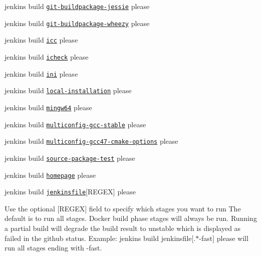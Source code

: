\begin{DoxyItemize}
\item jenkins build \href{https://build.libelektra.org/job/elektra-git-buildpackage-jessie/}{\tt git-\/buildpackage-\/jessie} please
\item jenkins build \href{https://build.libelektra.org/job/elektra-git-buildpackage-wheezy/}{\tt git-\/buildpackage-\/wheezy} please
\item jenkins build \href{https://build.libelektra.org/job/elektra-icc/}{\tt icc} please
\item jenkins build \href{https://build.libelektra.org/job/elektra-icheck/}{\tt icheck} please
\item jenkins build \href{https://build.libelektra.org/job/elektra-ini-mergerequests/}{\tt ini} please
\item jenkins build \href{https://build.libelektra.org/job/elektra-local-installation/}{\tt local-\/installation} please
\item jenkins build \href{https://build.libelektra.org/job/elektra-gcc-configure-mingw-w64/}{\tt mingw64} please
\item jenkins build \href{https://build.libelektra.org/job/elektra-multiconfig-gcc-stable/}{\tt multiconfig-\/gcc-\/stable} please
\item jenkins build \href{https://build.libelektra.org/job/elektra-multiconfig-gcc47-cmake-options/}{\tt multiconfig-\/gcc47-\/cmake-\/options} please
\item jenkins build \href{https://build.libelektra.org/job/elektra-source-package-test/}{\tt source-\/package-\/test} please
\item jenkins build \href{https://build.libelektra.org/job/elektra-homepage/}{\tt homepage} please
\item jenkins build \href{https://build.libelektra.org/jenkins/job/elektra-jenkinsfile/}{\tt jenkinsfile}\mbox{[}R\+E\+G\+EX\mbox{]} please
\begin{DoxyItemize}
\item Use the optional {\ttfamily \mbox{[}R\+E\+G\+EX\mbox{]}} field to specify which stages you want to run The default is to run all stages. Docker build phase stages will always be run. Running a partial build will degrade the build result to unstable which is displayed as failed in the github status. Example\+: {\ttfamily jenkins build jenkinsfile\mbox{[}.$\ast$-\/fast\mbox{]} please} will run all stages ending with {\ttfamily -\/fast}.
\end{DoxyItemize}
\end{DoxyItemize}

